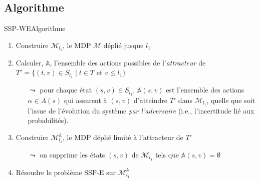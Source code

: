 \documentclass[compress]{beamer}
\theoremstyle{theorem}%
\begin{document}
\subsection{Algorithme}
\begin{frame}{SSP-WE}{Algorithme}
  \begin{enumerate}
    \item Construire $\mathcal{M}_{l_1}$, le MDP $\mathcal{M}$ déplié jusque $l_1$
    \item Calculer, $\mathbb{A}$, l'ensemble des actions possibles de l'\textit{\color{fibeamer@orange}attracteur} de $T' = \{ (t, v) \in S_{l_1} \; | \; t \in T \text{ et } v \leq l_1\}$
    \begin{itemize}
      \item[$\leadsto$] pour chaque état $(s, v) \in S_{l_1}$, $\mathbb{A}(s, v)$ est l'ensemble des actions $\alpha \in A(s)$ qui assurent à $(s, v)$ d'atteindre $T'$ dans $\mathcal{M}_{l_1}$, quelle que soit l'issue de l'évolution du système \textit{par l'adversaire} (i.e., l'incertitude lié aux probabilités).
    \end{itemize}
    \item Construire $\mathcal{M}^{\mathbb{A}}_{l_1}$, le MDP déplié limité à l'attracteur de $T'$
    \begin{itemize}
      \item[$\leadsto$] on supprime les états $(s, v)$ de $\mathcal{M}_{l_1}$ tels que $\mathbb{A}(s, v) = \emptyset$
    \end{itemize}
    \item Résoudre le problème SSP-E sur $\mathcal{M}_{l_1}^\mathbb{A}$
  \end{enumerate}
\end{frame}
\end{document}

